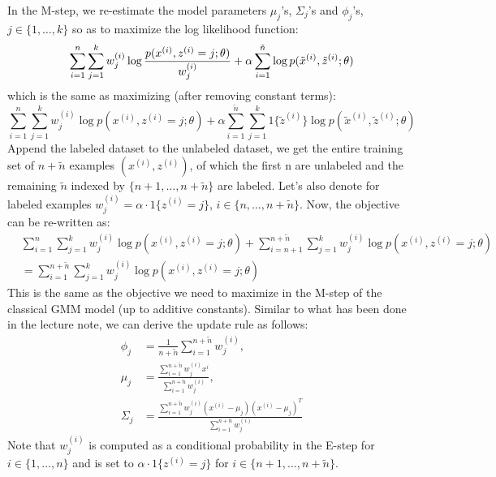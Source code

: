 \begin{answer}
In the M-step, we re-estimate the model parameters $\mu_j$'s, $\Sigma_j$'s and $\phi_j$'s, $j\in\{1,\dots,k\}$ so as to maximize the log likelihood function:
$$ \sum_{i=1}^{n}\sum_{j=1}^k w^{(i)}_j \log \frac{p(x^{(i)},z^{(i)}=j;\theta)}{w^{(i)}_j} + \alpha\sum_{i=1}^{\tilde{n}}\log p(\tilde{x}^{(i)},\tilde{z}^{(i)};\theta) \\ $$
which is the same as maximizing (after removing constant terms):
$$ \sum_{i=1}^{n}\sum_{j=1}^k w^{(i)}_j\log p(x^{(i)},z^{(i)}=j;\theta) + \alpha\sum_{i=1}^{\tilde{n}}\sum_{j=1}^k 1\{\tilde{z}^{(i)}\} \log p(\tilde{x}^{(i)},\tilde{z}^{(i)};\theta) $$
Append the labeled dataset to the unlabeled dataset, we get the entire training set of $n+\tilde{n}$ examples $(x^{(i)},z^{(i)})$, of which the first n are unlabeled and the  remaining $\tilde{n}$ indexed by $\{n+1,\dots,n+\tilde{n}\}$ are labeled. Let's also denote for labeled examples $w^{(i)}_j = \alpha \cdot 1\{z^{(i)}=j\}$, $i\in \{n,\dots, n+\tilde{n}\}$. Now, the objective can be re-written as:
\begin{align*}
	&\sum_{i=1}^{n}\sum_{j=1}^k w^{(i)}_j\log p(x^{(i)},z^{(i)}=j;\theta) + \sum_{i=n+1}^{n+\tilde{n}}\sum_{j=1}^k w^{(i)}_j\log p(x^{(i)},z^{(i)}=j;\theta) \\ 
	&= \sum_{i=1}^{n+\tilde{n}}\sum_{j=1}^k w^{(i)}_j\log p(x^{(i)},z^{(i)}=j;\theta)
\end{align*}
This is the same as the objective we need to maximize in the M-step of the classical GMM model (up to additive constants). Similar to what has been done in the lecture note, we can derive the update rule as follows:
\begin{align*}
	\phi_j &= \frac{1}{n+\tilde{n}} \sum_{i=1}^{n+\tilde{n}} w^{(i)}_j, \\
	\mu_j &= \frac{\sum_{i=1}^{n+\tilde{n}} w^{(i)}_j x^{i}}{\sum_{i=1}^{n+\tilde{n}} w^{(i)}_j}, \\
	\Sigma_j &= \frac{\sum_{i=1}^{n+\tilde{n}} w^{(i)}_j (x^{(i)}-\mu_j)(x^{(i)}-\mu_j)^T}{\sum_{i=1}^{n+\tilde{n}} w^{(i)}_j}
\end{align*}
Note that $w^{(i)}_j$ is computed as a conditional probability in the E-step for $i\in\{1,\dots,n\}$ and is set to $\alpha \cdot 1\{z^{(i)}=j\}$ for $i \in \{n+1,\dots,n+\tilde{n}\}$. \\
\end{answer}
















